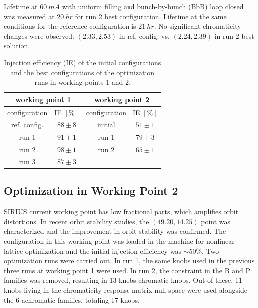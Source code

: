 \documentclass[a4paper,
               keeplastbox,   %
               ]{jacow}
\begin{document}
Lifetime at $60~\unit{mA}$ with uniform filling and bunch-by-bunch (BbB) loop closed was measured at $20~\unit{hr}$ for run 2 best configuration. Lifetime at the same conditions for the reference configuration is $21~\unit{hr}$. No significant chromaticity changes were observed: $(2.33, 2.53)$ in ref. config. vs. $(2.24, 2.39)$ in run 2 best solution.  
\begin{table}[!h]
\centering
\caption{Injection efficiency (IE) of the initial configurations and the best configurations of the optimization runs in working points 1 and 2.} 
\begin{tabular}{cccc}
\toprule
\multicolumn{2}{c}{working point 1}         & \multicolumn{2}{c}{working point 2}                \\ \midrule
configuration & IE $[\%]$ & configuration        & IE $[\%]$ \\ \hline
ref. config.  & $88\pm8$                & initial              & $51\pm1$                \\
run 1         & $91\pm1$                & run 1                & $79\pm3$                \\
run 2         & $98\pm1$                & run 2                & $65\pm1    $                \\
run 3         & $87\pm3$                & \multicolumn{1}{l}{} & \multicolumn{1}{l}{}        \\ \hline
\end{tabular}

\label{table1}
\end{table}


\subsection{Optimization in Working Point 2}
 SIRIUS current working point has low fractional parts, which amplifies orbit distortions. In recent orbit stability studies, the $(49.20, 14.25)$ point was characterized and the improvement in orbit stability was confirmed. The configuration in this working point was loaded in the machine for nonlinear lattice optimization and the initial injection efficiency was $\sim50\%$. Two optimization runs were carried out. In run 1, the same knobs used in the previous three runs at working point 1 were used. In run 2, the constraint in the B and P families was removed, resulting in 13 knobs chromatic knobs. Out of these, 11 knobs living in the chromaticity response matrix null space were used alongside the 6 achromatic families, totaling 17 knobs. 
 
\end{document}
